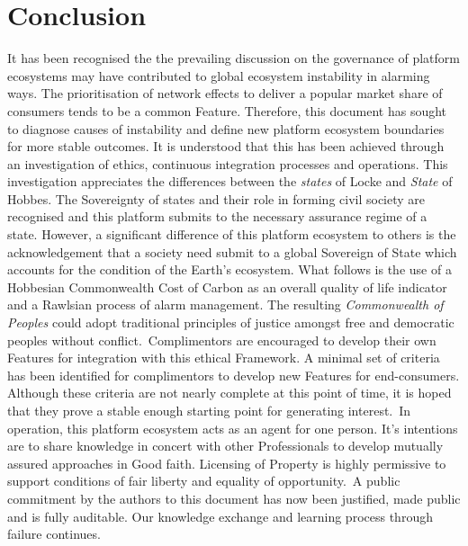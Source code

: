 \documentclass[11pt, oneside]{article}   	%
\begin{document}
\section{Conclusion}
It has been recognised the the prevailing discussion on the governance of platform ecosystems may have contributed to global ecosystem instability in alarming ways.
The prioritisation of network effects to deliver a popular market share of consumers tends to be a common Feature.
Therefore, this document has sought to diagnose causes of instability and define new platform ecosystem boundaries for more stable outcomes.
It is understood that this has been achieved through an investigation of ethics, continuous integration processes and operations.
This investigation appreciates the differences between the \emph{states} of Locke and \emph{State} of Hobbes.
The Sovereignty of states and their role in forming civil society are recognised and this platform submits to the necessary assurance regime of a state.
However, a significant difference of this platform ecosystem to others is the acknowledgement that a society need submit to a global Sovereign of State which accounts for the condition of the Earth's ecosystem.
What follows is the use of a Hobbesian Commonwealth Cost of Carbon as an overall quality of life indicator and a Rawlsian process of alarm management.
The resulting \emph{Commonwealth of Peoples} could adopt traditional principles of justice amongst free and democratic peoples without conflict.\
Complimentors are encouraged to develop their own Features for integration with this ethical Framework.
A minimal set of criteria has been identified for complimentors to develop new Features for end-consumers.
Although these criteria are not nearly complete at this point of time, it is hoped that they prove a stable enough starting point for generating interest.\
In operation, this platform ecosystem acts as an agent for one person.
It's intentions are to share knowledge in concert with other Professionals to develop mutually assured approaches in Good faith.
Licensing of Property is highly permissive to support conditions of fair liberty and equality of opportunity.\
A public commitment by the authors to this document has now been justified, made public and is fully auditable.
Our knowledge exchange and learning process through failure continues.\
\end{document}
